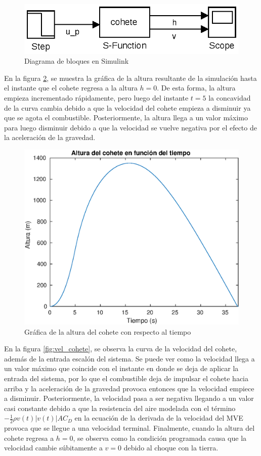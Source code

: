 \documentclass[12pt,letterpaper]{article}
\begin{document}
\begin{figure}[ht!]
  \centering
  \includegraphics[width=0.5\linewidth]{pictures/Ejercicio3/simulink_cohete.eps}
  \caption{Diagrama de bloques en Simulink}
  \label{fig:diag_simulink}
\end{figure}

En la figura \ref{fig:alt_cohete}, se muestra la gráfica de la altura resultante de la simulación
hasta el instante que el cohete regresa a la altura $h=0$. De esta forma, la altura empieza
incrementado rápidamente, pero luego del instante $t=5$ la concavidad de la curva cambia debido a
que la velocidad del cohete empieza a disminuir ya que se agota el combustible. Posteriormente, la
altura llega a un valor máximo para luego disminuir debido a que la velocidad se vuelve negativa por
el efecto de la aceleración de la gravedad.


\begin{figure}[ht!]
  \centering
  \includegraphics[width=0.5\linewidth]{pictures/Ejercicio3/altura_cohete_vs_tiempo.eps}
  \caption{Gráfica de la altura del cohete con respecto al tiempo}
  \label{fig:alt_cohete}
\end{figure}

En la figura \ref{fig:vel_cohete}, se observa la curva de la velocidad del cohete, además de la
entrada escalón del sistema. Se puede ver como la velocidad llega a un valor máximo que coincide con
el instante en donde se deja de aplicar la entrada del sistema, por lo que el combustible deja de
impulsar el cohete hacia arriba y la aceleración de la gravedad provoca entonces que la velocidad
empiece a disminuir. Posteriormente, la velocidad pasa a ser negativa llegando a un valor casi
constante debido a que la resistencia del aire modelada con el término
$-\frac{1}{2}\rho v(t)|v(t)| A C_D$ en la ecuación de la derivada de la velocidad del MVE provoca
que se llegue a una velocidad terminal. Finalmente, cuando la altura del cohete regresa a $h=0$, se
observa como la condición programada causa que la velocidad cambie súbitamente a $v=0$ debido al
choque con la tierra.
\end{document}
